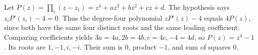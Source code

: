 Let $P(z)=\prod_i(z-z_i)=z^4+az^3+bz^2+cz+d$. The hypothesis says $z_iP\prime(z_i)-4=0$. Thus the degree-four polynomial $zP\prime(z)-4$ equals $4P(z)$, since both have the same four distinct roots and the same leading coefficient. Comparing coefficients yields $3a=4a,2b=4b,c=4c,-4=4d$, so $P(z)=z^4-1$. Its roots are $1,-1,i,-i$. Their sum is $\boxed0$, product $\boxed{-1}$, and sum of squares $\boxed0$.
